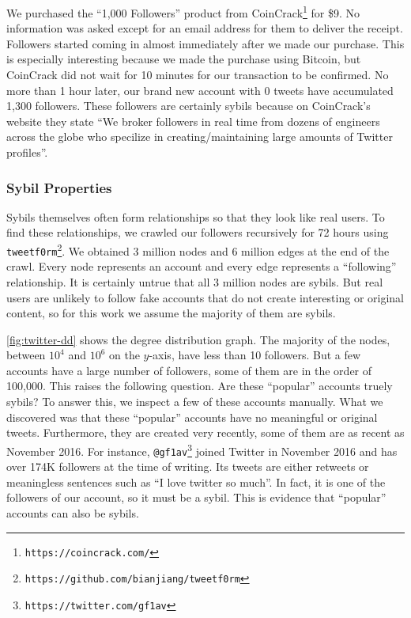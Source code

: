 We purchased the ``1,000 Followers'' product from
CoinCrack\footnote{\texttt{https://coincrack.com/}} for \$9. No information was
asked except for an email address for them to deliver the receipt. Followers
started coming in almost immediately after we made our purchase. This is
especially interesting because we made the purchase using Bitcoin, but CoinCrack
did not wait for 10 minutes for our transaction to be confirmed. No more than 1
hour later, our brand new account with 0 tweets have accumulated 1,300
followers. These followers are certainly sybils because on CoinCrack's website
they state ``We broker followers in real time from dozens of engineers across
the globe who specilize in creating/maintaining large amounts of Twitter
profiles''.

\subsubsection{Sybil Properties}
Sybils themselves often form relationships so that they look like real users. To
find these relationships, we crawled our followers recursively for 72 hours
using
\verb!tweetf0rm!\footnote{\texttt{https://github.com/bianjiang/tweetf0rm}}. We
obtained 3 million nodes and 6 million edges at the end of the crawl. Every node
represents an account and every edge represents a ``following'' relationship. It
is certainly untrue that all 3 million nodes are sybils. But real users are
unlikely to follow fake accounts that do not create interesting or original
content, so for this work we assume the majority of them are sybils.

\autoref{fig:twitter-dd} shows the degree distribution graph. The majority of
the nodes, between $10^4$ and $10^6$ on the $y$-axis, have less than 10
followers. But a few accounts have a large number of followers, some of them are
in the order of 100,000. This raises the following question. Are these
``popular'' accounts truely sybils? To answer this, we inspect a few of these
accounts manually. What we discovered was that these ``popular'' accounts have
no meaningful or original tweets. Furthermore, they are created very recently,
some of them are as recent as November 2016. For instance,
\verb!@gf1av!\footnote{\texttt{https://twitter.com/gf1av}} joined Twitter in
November 2016 and has over 174K followers at the time of writing. Its tweets are
either retweets or meaningless sentences such as ``I love twitter so much''. In
fact, it is one of the followers of our account, so it must be a sybil. This is
evidence that ``popular'' accounts can also be sybils.

